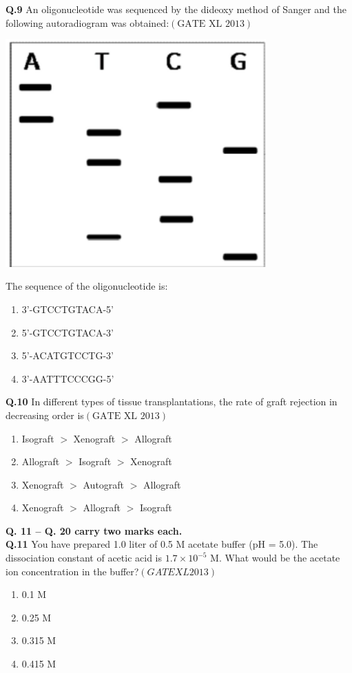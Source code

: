 \documentclass[12pt]{article}
\theoremstyle{remark}
\providecommand{\brak}[1]{\ensuremath{\left(#1\right)}}
\begin{document}
\textbf{Q.9} An oligonucleotide was sequenced by the dideoxy method of Sanger and the following autoradiogram was obtained:\hfill $\brak{\text{GATE XL 2013}}$
\begin{center}
    \includegraphics[width=0.75\textwidth]{figs/Screenshot 2025-08-05 122205.png}
\end{center}
The sequence of the oligonucleotide is:
\begin{enumerate}
    \item 3’-GTCCTGTACA-5’
    \item 5’-GTCCTGTACA-3’
    \item 5’-ACATGTCCTG-3’
    \item 3’-AATTTCCCGG-5’
\end{enumerate}

\textbf{Q.10} In different types of tissue transplantations, the rate of graft rejection in decreasing order is\hfill $\brak{\text{GATE XL 2013}}$
\begin{enumerate}
    \item Isograft $>$ Xenograft $>$ Allograft
    \item Allograft $>$ Isograft $>$ Xenograft
    \item Xenograft $>$ Autograft $>$ Allograft
    \item Xenograft $>$ Allograft $>$ Isograft
\end{enumerate}

\noindent\textbf{Q. 11 – Q. 20 carry two marks each.}\\

\textbf{Q.11} You have prepared 1.0 liter of 0.5 M acetate buffer (pH = 5.0). The dissociation constant of acetic acid is $1.7 \times 10^{-5}$ M. What would be the acetate ion concentration in the buffer?\hfill  \textit{\brak{GATE XL 2013}}
\begin{enumerate}
    \item 0.1 M
    \item 0.25 M
    \item 0.315 M
    \item 0.415 M
\end{enumerate}
\end{document}
